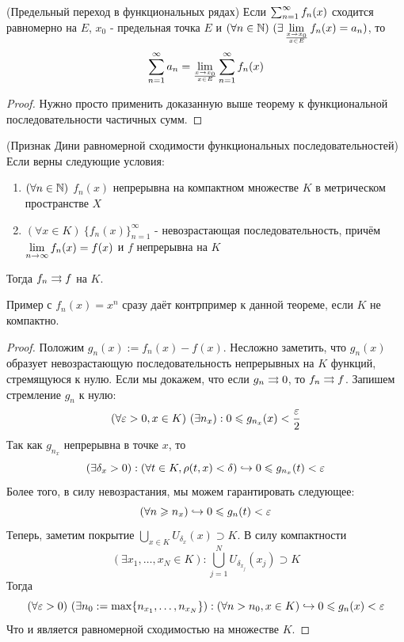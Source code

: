 \begin{theorem} (Предельный переход в функциональных рядах)
	Если $\sum_{n = 1}^\infty f_n(x)$ сходится равномерно на $E$, $x_0$ - предельная точка $E$ и $(\forall n \in \mathbb{N})\ (\exists \lim\limits_{x \to x_0 \over x \in E} f_n(x) = a_n)$, то
	\[
		\sum_{n = 1}^\infty a_n = \lim\limits_{x \to x_0 \over x \in E} \sum_{n = 1}^\infty f_n(x)
	\]
\end{theorem}

\begin{proof}
	Нужно просто применить доказанную выше теорему к функциональной последовательности частичных сумм.
\end{proof}

\begin{theorem} (Признак Дини равномерной сходимости функциональных последовательностей)
	Если верны следующие условия:
	\begin{enumerate}
		\item $(\forall n \in \mathbb{N})$ $f_n(x)$ непрерывна на компактном множестве $K$ в метрическом пространстве $X$
		
		\item $(\forall x \in K)\ \{f_n(x)\}_{n = 1}^\infty$ - невозрастающая последовательность, причём $\lim\limits_{n \to \infty} f_n(x) = f(x)$ и $f$ непрерывна на $K$
	\end{enumerate}
	Тогда $f_n \rightrightarrows f$ на $K$.	
\end{theorem}

\begin{note}
	Пример с $f_n(x) = x^n$ сразу даёт контрпример к данной теореме, если $K$ не компактно.
\end{note}

\begin{proof}
	Положим $g_n(x) := f_n(x) - f(x)$. Несложно заметить, что $g_n(x)$ образует невозрастающую последовательность непрерывных на $K$ функций, стремящуюся к нулю. Если мы докажем, что если $g_n \rightrightarrows 0$, то $f_n \rightrightarrows f$. Запишем стремление $g_n$ к нулю:
	\[
		(\forall \eps > 0, x \in K)\ (\exists n_x) : 0 \le g_{n_x}(x) < \frac{\eps}{2}
	\]
	Так как $g_{n_x}$ непрерывна в точке $x$, то
	\[
		(\exists \delta_x > 0) : (\forall t \in K, \rho(t, x) < \delta) \hookrightarrow 0 \leqslant g_{n_x}(t) < \varepsilon
	\]
	Более того, в силу невозрастания, мы можем гарантировать следующее:
	\[
		(\forall n \geqslant n_x) \hookrightarrow 0 \leqslant g_n(t) < \varepsilon
	\]
	Теперь, заметим покрытие $\bigcup_{x \in K} U_{\delta_x}(x) \supset K$. В силу компактности
	\[
		(\exists x_1, \ldots, x_N \in K) : \bigcup_{j = 1}^N U_{\delta_{x_j}}(x_j) \supset K
	\]
	Тогда
	\[
		(\forall \varepsilon > 0)\ (\exists n_0 := \max \{n_{x_1}, \ldots, n_{x_N}\}) : (\forall n > n_0, x \in K) \hookrightarrow 0 \leqslant g_n(x) < \varepsilon
	\]
	Что и является равномерной сходимостью на множестве $K$.
\end{proof}

